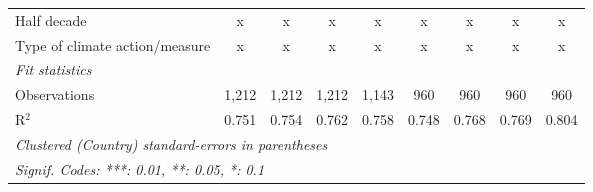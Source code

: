 \begin{table}[htbp]
\begin{tabular}{lcccccccc}
      Half decade                                             & x       & x       & x             & x             & x            & x             & x             & x\\  
      Type of climate action/measure                          & x       & x       & x             & x             & x            & x             & x             & x\\  
      \midrule \emph{Fit statistics}\\
      Observations                                            & 1,212   & 1,212   & 1,212         & 1,143         & 960          & 960           & 960           & 960\\  
      R$^2$                                                   & 0.751   & 0.754   & 0.762         & 0.758         & 0.748        & 0.768         & 0.769         & 0.804\\  
      \midrule
      \multicolumn{9}{l}{\emph{Clustered (Country) standard-errors in parentheses}}\\
      \multicolumn{9}{l}{\emph{Signif. Codes: ***: 0.01, **: 0.05, *: 0.1}}\\
   \end{tabular}
\end{table}



